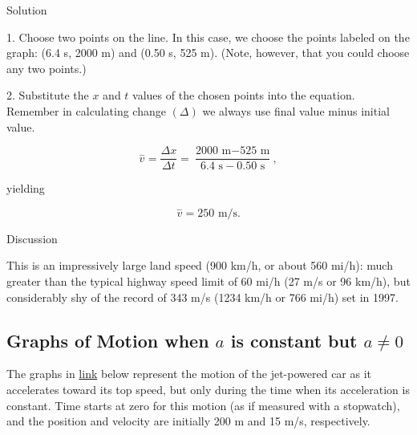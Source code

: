 \documentclass[
]{book}
\newenvironment{tinysection}{}{}
\begin{document}
\begin{tinysection}

{Solution}

\end{tinysection}

1. Choose two points on the line. In this case, we choose the points
labeled on the graph: (6.4 s, 2000 m) and (0.50 s, 525 m). (Note,
however, that you could choose any two points.)

2. Substitute the \(x\) and \(t\) values of the chosen points into the
equation. Remember in calculating change \({(\Delta)}{}\) we always use
final value minus initial value.

\leavevmode\hypertarget{import-auto-id4181834}{}%
\[{{{\overset{-}{v} = \frac{\Delta x}{\Delta t}} = \frac{\text{2000\ m} - \text{525\ m}}{6\text{.}{\text{4\ s} - 0}\text{.}\text{50\ s}}},}{}\]

yielding

\leavevmode\hypertarget{import-auto-id2024433}{}%
\[{{\overset{-}{v} = \text{250\ m/s}}.}{}\]

\begin{tinysection}

{Discussion}

\end{tinysection}

This is an impressively large land speed (900 km/h, or about 560 mi/h):
much greater than the typical highway speed limit of 60 mi/h (27 m/s or
96 km/h), but considerably shy of the record of 343 m/s (1234 km/h or
766 mi/h) set in 1997.

\hypertarget{fs-id2570304}{}
\hypertarget{graphs-of-motion-when-a-is-constant-but-a-neq-0}{%
\subsection{\texorpdfstring{Graphs of Motion when \(a{}\) is constant but \({a \neq 0}{}\)}{Graphs of Motion when a\{\} is constant but \{a \textbackslash neq 0\}\{\}}}\label{graphs-of-motion-when-a-is-constant-but-a-neq-0}}

The graphs in \protect\hyperlink{import-auto-id3596921}{link}
below represent the motion of the jet-powered car as it accelerates
toward its top speed, but only during the time when its acceleration is
constant. Time starts at zero for this motion (as if measured with a
stopwatch), and the position and velocity are initially 200 m and 15
m/s, respectively.
\end{document}
